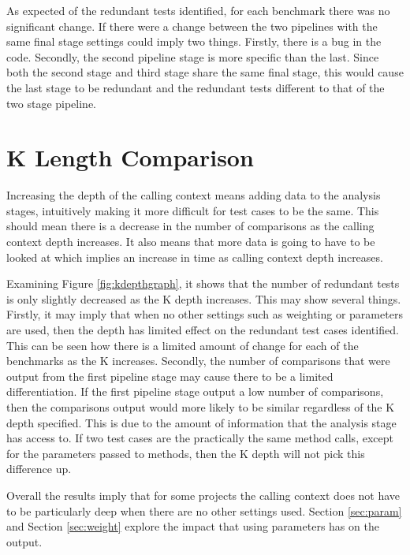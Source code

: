 As expected of the redundant tests identified, for each benchmark there was no significant change. If there were a change between the two pipelines with the same final stage settings could imply two things. Firstly, there is a bug in the code. Secondly, the second pipeline stage is more specific than the last. Since both the second stage and third stage share the same final stage, this would cause the last stage to be redundant and the redundant tests different to that of the two stage pipeline. 

\section{K Length Comparison}

Increasing the depth of the calling context means adding data to the analysis stages, intuitively making it more difficult for test cases to be the same. This should mean there is a decrease in the number of comparisons as the calling context depth increases. It also means that more data is going to have to be looked at which implies an increase in time as calling context depth increases.

Examining Figure \ref{fig:kdepthgraph}, it shows that the number of redundant tests is only slightly decreased as the K depth increases. This may show several things. Firstly, it may imply that when no other settings such as weighting or parameters are used, then the depth has limited effect on the redundant test cases identified. This can be seen how there is a limited amount of change for each of the benchmarks as the K increases. Secondly, the number of comparisons that were output from the first pipeline stage may cause there to be a limited differentiation. If the first pipeline stage output a low number of comparisons, then the comparisons output would more likely to be similar regardless of the K depth specified. This is due to the amount of information that the analysis stage has access to. If two test cases are the practically the same method calls, except for the parameters passed to methods, then the K depth will not pick this difference up.

Overall the results imply that for some projects the calling context does not have to be particularly deep when there are no other settings used. Section \ref{sec:param} and Section \ref{sec:weight} explore the impact that using parameters has on the output.


